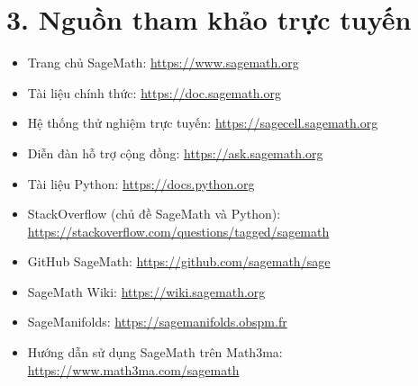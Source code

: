 \section*{3. Nguồn tham khảo trực tuyến}
\begin{itemize}
	\item Trang chủ SageMath: \url{https://www.sagemath.org}
	\item Tài liệu chính thức: \url{https://doc.sagemath.org}
	\item Hệ thống thử nghiệm trực tuyến: \url{https://sagecell.sagemath.org}
	\item Diễn đàn hỗ trợ cộng đồng: \url{https://ask.sagemath.org}
	\item Tài liệu Python: \url{https://docs.python.org}
	\item StackOverflow (chủ đề SageMath và Python): \url{https://stackoverflow.com/questions/tagged/sagemath}
	\item GitHub SageMath: \url{https://github.com/sagemath/sage}
	\item SageMath Wiki: \url{https://wiki.sagemath.org}
	\item SageManifolds: \url{https://sagemanifolds.obspm.fr}
	\item Hướng dẫn sử dụng SageMath trên Math3ma: \url{https://www.math3ma.com/sagemath}
\end{itemize}
